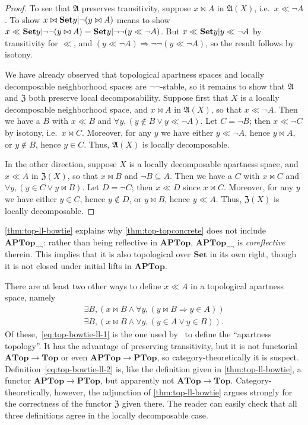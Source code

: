 \documentclass{article}
\def\cpl#1{\neg #1}
\let\implies\Rightarrow
\def\anti{\mathfrak{A}}
\def\neigh{\mathfrak{Z}}
\def\nn{\ensuremath{\neg\neg}}
\def\Set{\mathbf{Set}}
\def\PTop{\mathbf{PTop}}
\def\Top{\mathbf{Top}}
\def\APTop{\mathbf{APTop}}
\def\ATop{\mathbf{ATop}}
\def\APTopnn{\mathbf{APTop}_{\nn}}
\begin{document}
\begin{proof}
  To see that $\anti$ preserves transitivity, suppose $x\bowtie A$ in $\anti(X)$, i.e.\ $x\ll \cpl{A}$.
  To show $x\bowtie \setof{y|\neg(y\bowtie A)}$ means to show $x\ll \setof{y|\neg\neg(y\bowtie A)} = \setof{y|\neg\neg(y\ll \cpl{A})}$.
  But $x\ll \setof{y|y\ll \cpl{A}}$ by transitivity for $\ll$, and $(y\ll \cpl{A})\implies\neg\neg(y\ll\cpl{A})$, so the result follows by isotony.

  We have already observed that topological apartness spaces and locally decomposable neighborhood spaces are \nn-stable, so it remains to show that $\anti$ and $\neigh$ both preserve local decomposability.
  Suppose first that $X$ is a locally decomposable neighborhood space, and $x \bowtie A$ in $\anti(X)$, so that $x\ll \cpl{A}$.
  Then we have a $B$ with $x\ll B$ and $\forall y, (y\notin B \lor y\ll \cpl{A})$.
  Let $C = \cpl{B}$; then $x\ll \cpl{C}$ by isotony, i.e.\ $x\bowtie C$.
  Moreover, for any $y$ we have either $y\ll\cpl{A}$, hence $y\bowtie A$, or $y\notin B$, hence $y\in C$.
  Thus, $\anti(X)$ is locally decomposable.

  In the other direction, suppose $X$ is a locally decomposable apartness space, and $x\ll A$ in $\neigh(X)$, so that $x\bowtie B$ and $\cpl{B}\subseteq A$.
  Then we have a $C$ with $x\bowtie C$ and $\forall y, (y\in C \lor y\bowtie B)$.
  Let $D = \cpl{C}$; then $x\ll D$ since $x\bowtie C$.
  Moreover, for any $y$ we have either $y\in C$, hence $y\notin D$, or $y\bowtie B$, hence $y\ll A$.
  Thus, $\neigh(X)$ is locally decomposable.
\end{proof}

\begin{rmk}
  \cref{thm:top-ll-bowtie} explains why \cref{thm:top-topconcrete} does not include $\APTopnn$: rather than being reflective in $\APTop$, $\APTopnn$ is \emph{coreflective} therein.
  This implies that it is also topological over $\Set$ in its own right, though it is not closed under initial lifts in $\APTop$.
\end{rmk}

\begin{rmk}
  There are at least two other ways to define $x\ll A$ in a topological apartness space, namely
  \begin{gather}
    \exists B, (x\bowtie B \land \forall y, (y\bowtie B \implies y\in A))\label{eq:top-bowtie-ll-1}\\
    \exists B, (x\bowtie B \land \forall y, (y\in A \lor y\in B)).\label{eq:top-bowtie-ll-2}
  \end{gather}
  Of these,~\eqref{eq:top-bowtie-ll-1} is the one used by~\cite{bridges} to define the ``apartness topology''.
  It has the advantage of preserving transitivity, but it is not functorial $\ATop \to \Top$ or even $\APTop \to \PTop$, so category-theoretically it is suspect.
  Definition~\eqref{eq:top-bowtie-ll-2} is, like the definition given in \cref{thm:top-ll-bowtie}, a functor $\APTop \to \PTop$, but apparently not $\ATop \to \Top$.
  Category-theoretically, however, the adjunction of \cref{thm:top-ll-bowtie} argues strongly for the correctness of the functor $\neigh$ given there.
  The reader can easily check that all three definitions agree in the locally decomposable case.
\end{rmk}
\end{document}

